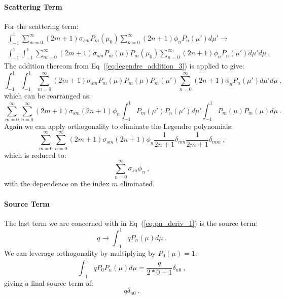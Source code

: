\documentclass[letterpaper,12pt]{article}
\begin{document}
\paragraph{Scattering Term}
For the scattering term:
\begin{multline}
  \int_{-1}^1 \sum_{m=0}^\infty (2m+1) \sigma_{sm} P_m(\mu_0)
  \sum_{n=0}^\infty (2n+1) \phi_n P_n(\mu') d\mu' \rightarrow\\
  \int_{-1}^1 \int_{-1}^1 \sum_{m=0}^\infty (2m+1) \sigma_{sm} P_m(\mu)
  P_m(\mu_0) \sum_{n=0}^\infty (2n+1) \phi_n P_n(\mu') d\mu' d\mu\:.
  \label{eq:pn_deriv_10}
\end{multline}
The addition thereom from Eq~(\ref{eq:legendre_addition_3}) is applied
to give:
\begin{equation}
  \int_{-1}^1 \int_{-1}^1 \sum_{m=0}^\infty (2m+1) \sigma_{sm} P_m(\mu)
  P_m(\mu)P_m(\mu') \sum_{n=0}^\infty (2n+1) \phi_n P_n(\mu') d\mu' d\mu\:,
  \label{eq:pn_deriv_11}
\end{equation}
which can be rearranged as:
\begin{equation}
  \sum_{m=0}^\infty \sum_{n=0}^\infty (2m+1) \sigma_{sm} (2n+1) \phi_n
  \int_{-1}^1 P_m(\mu') P_n(\mu') d\mu' \int_{-1}^1 P_m(\mu) P_m(\mu)
  d\mu\:.
  \label{eq:pn_deriv_12}
\end{equation}
Again we can apply orthogonality to eliminate the Legendre polynomials:
\begin{equation}
  \sum_{m=0}^\infty \sum_{n=0}^\infty (2m+1) \sigma_{sm} (2n+1) \phi_n
  \frac{1}{2n+1}\delta_{nm}\frac{1}{2m+1}\delta_{mm}\:,
  \label{eq:pn_deriv_13}
\end{equation}
which is reduced to:
\begin{equation}
  \sum_{n=0}^\infty \sigma_{sn} \phi_n\:,
  \label{eq:pn_deriv_14}
\end{equation}
with the dependence on the index $m$ eliminated.

\paragraph{Source Term}
The last term we are concerned with in Eq~(\ref{eq:pn_deriv_1}) is the
source term:
\begin{equation}
  q \rightarrow \int_{-1}^1 q P_n(\mu) d\mu \:.
  \label{eq:pn_deriv_15}
\end{equation}
We can leverage orthogonality by multiplying by $P_0(\mu) = 1$:
\begin{equation}
  \int_{-1}^1 q P_0 P_n(\mu) d\mu = \frac{q}{2*0+1}\delta_{n0}\:,
  \label{eq:pn_deriv_16}
\end{equation}
giving a final source term of:
\begin{equation}
  q\delta_{n0}\:.
  \label{eq:pn_deriv_17}
\end{equation}
\end{document}

